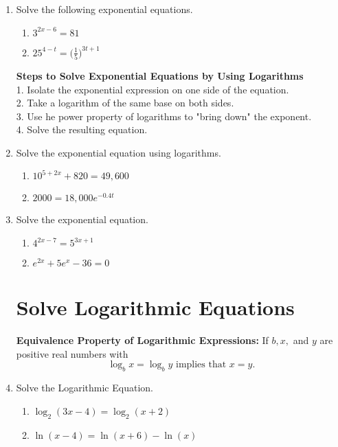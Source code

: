 \documentclass[11pt]{article}
\begin{document}
\begin{enumerate}
\item Solve the following exponential equations.
\begin{enumerate}
\item $\displaystyle 3^{2x-6}=81$\vfill
\item $\displaystyle 25^{4-t}=\Bigg(\frac{1}{5}\Bigg)^{3t+1}$\vfill
\end{enumerate}

\newpage

\noindent \textbf{Steps to Solve Exponential Equations by Using Logarithms}\\
1. Isolate the exponential expression on one side of the equation.\\
2. Take a logarithm of the same base on both sides.\\
3. Use he power property of logarithms to "bring down" the exponent.\\
4. Solve the resulting equation.\\

\item Solve the exponential equation using logarithms.
\begin{enumerate}
\item $\displaystyle 10^{5+2x}+820=49,600$\vfill
\item $\displaystyle 2000=18,000e^{-0.4t}$\vfill
\end{enumerate}



\item Solve the exponential equation.
\begin{enumerate}
\item $\displaystyle 4^{2x-7}=5^{3x+1}$\vfill
\item $\displaystyle e^{2x}+5e^x-36=0$\vfill
\end{enumerate}

\newpage

\section{Solve Logarithmic Equations}
\noindent \textbf{Equivalence Property of Logarithmic Expressions:} If $b, x,$ and $y$ are positive real numbers with $$\log_b x = \log_b y \text{ implies that } x=y.$$   


\item Solve the Logarithmic Equation.
\begin{enumerate}
\item $\displaystyle \log_2(3x-4)=\log_2(x+2)$\vfill
\item $\displaystyle \ln(x-4)=\ln(x+6)-\ln(x)$\vfill
\vfill
\end{enumerate}


\end{enumerate}
\end{document}
